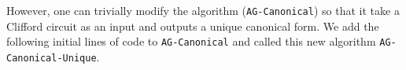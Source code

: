 %
%
%

However, one can trivially modify the algorithm ({\tt AG-Canonical}) \cite{AG04} so that it take a Clifford circuit as an input and outputs a unique canonical form. We add the following initial lines of code to {\tt AG-Canonical} and called this new algorithm {\tt AG-Canonical-Unique}.




